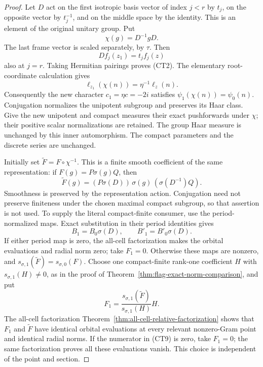 \begin{proof}
Let \(D\) act on the first isotropic basis vector of index
\(j<r\) by \(t_j\), on the opposite vector by \(t_j^{-1}\),
and on the middle space by the identity. This is an element
of the original unitary group. Put
\[
                  \chi(g)=D^{-1}gD .
                                                        \tag{CT5}
\]
The last frame vector is scaled separately, by \(\tau\).
Then
\[
 Df_j(z_1)=t_jf_j(z)
\]
also at \(j=r\). Taking Hermitian pairings proves (CT2).
The elementary root-coordinate calculation gives
\[
 \ell_{z_1}(\chi(n))=\eta^{-1}\ell_z(n).
                                                        \tag{CT6}
\]
Consequently the new character \(c_1=\eta c=-2i\) satisfies
\(\psi_1(\chi(n))=\psi_0(n)\).
Conjugation normalizes the unipotent subgroup and preserves
its Haar class. Give the new unipotent and compact measures
their exact pushforwards under \(\chi\); their positive
scalar normalizations are retained. The group Haar measure
is unchanged by this inner automorphism. The compact
parameters and the discrete series are unchanged.

Initially set \(\widetilde F=F\circ\chi^{-1}\).
This is a finite smooth coefficient of the same representation:
if \(F(g)=P\sigma(g)Q\), then
\[
 \widetilde F(g)
       =(P\sigma(D))\,\sigma(g)\,(\sigma(D^{-1})Q).
                                                        \tag{CT7}
\]
Smoothness is preserved by the representation action.
Conjugation need not preserve finiteness under the chosen
maximal compact subgroup, so that assertion is not used.
To supply the literal compact-finite consumer, use the
period-normalized maps. Exact substitution in their period
identities gives
\[
          B_1=B_0\sigma(D),\qquad B'_1=B'_0\sigma(D).
                                                        \tag{CT8}
\]
If either period map is zero, the all-cell factorization makes
the orbital evaluations and radial norm zero; take \(F_1=0\).
Otherwise these maps are nonzero, and
\(s_{\sigma,1}(\widetilde F)=s_{\sigma,0}(F)\).
Choose one compact-finite rank-one coefficient \(H\)
with \(s_{\sigma,1}(H)\ne0\), as in the proof of
Theorem~\ref{thm:flag-exact-norm-comparison}, and put
\[
 F_1=\frac{s_{\sigma,1}(\widetilde F)}
                         {s_{\sigma,1}(H)}H .
                                                        \tag{CT9}
\]
The all-cell factorization
Theorem~\ref{thm:all-cell-relative-factorization}
shows that \(F_1\) and \(\widetilde F\) have identical
orbital evaluations at every relevant nonzero-Gram point
and identical radial norms. If the numerator in (CT9)
is zero, take \(F_1=0\); the same factorization proves
all these evaluations vanish. This choice is independent
of the point and section.


\end{proof}
